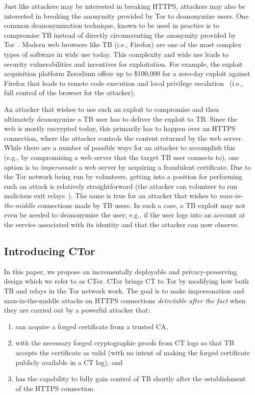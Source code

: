 Just like attackers may be interested in breaking HTTPS, attackers may also be
interested in breaking the anonymity provided by Tor to deanonymize users. One
common deanonymization technique, known to be used in practice 
is to compromise TB instead of directly circumventing the anonymity
provided by Tor~\cite{selfrando,lepop1,lepop2,zerotor}. Modern web
browsers like TB (i.e., Firefox) are one of the most complex types of software in wide
use today. This complexity and wide use leads to security vulnerabilities and
incentives for exploitation. For example, the exploit acquisition platform
Zerodium offers up to \$100,000 for a zero-day exploit against Firefox that
leads to remote code execution and local privilege escalation~\cite{zeromain}
(i.e., full control of the browser for the attacker).

An attacker that wishes to use such an exploit to compromise and then ultimately
deanonymize a TB user has to deliver the exploit to TB\@. Since the web is
mostly encrypted today, this primarily has to happen over an HTTPS connection,
where the attacker controls the content returned by the web server. While there
are a number of possible ways for an attacker to accomplish this (e.g., by
compromising a web server that the target TB user connects to), one option is to
\emph{impersonate} a web server by acquiring a fraudulent certificate. Due to
the Tor network being run by volunteers, getting into a position for performing
such an attack is relatively straightforward (the attacker can volunteer to run
malicious exit relays~\cite{spoiled-onions}). The same is true for an attacker that
wishes to \emph{man-in-the-middle} connections made by TB users. In such a case,
a TB exploit may not even be needed to deanonymize the user; e.g., if the user
logs into an account at the service associated with its identity and that the
attacker can now observe.

\subsection{Introducing CTor}
In this paper, we propose an incrementally deployable and privacy-preserving
design which we refer to as CTor. CTor brings CT to Tor by modifying how both TB
and relays in the Tor network work. The goal is to make impersonation and
man-in-the-middle attacks on HTTPS connections \emph{detectable after the fact}
when they are carried out by a powerful attacker that:
\begin{enumerate}
	\item can acquire a forged certificate from a trusted CA,
	\item with the necessary forged cryptographic proofs from CT logs so that TB
	accepts the certificate as valid (with no intent of making the forged
	certificate publicly available in a CT log), and
	\item has the capability to fully gain control of TB shortly after the
	establishment of the HTTPS connection.
\end{enumerate}


